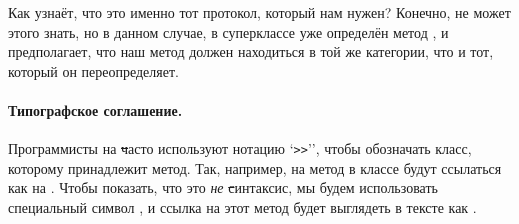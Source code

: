 \documentclass[a4paper,10pt,twoside]{book}
\begin{document}
Как \pharo узнаёт, что это именно тот протокол, который нам нужен? Конечно, \pharo не может этого знать, но в данном случае, в суперклассе уже определён метод , и \pharo предполагает, что наш метод  должен находиться в той же категории, что и тот, который он переопределяет.


\paragraph{Типографское соглашение.} Программисты на \st часто используют нотацию `\verb|>>|'', чтобы обозначать класс, которому принадлежит метод. Так, например, на метод  в классе  будут ссылаться как на .
Чтобы показать, что это \emph{не} \st синтаксис, мы будем использовать специальный символ \ct{>>>}, и ссылка на этот метод будет выглядеть в тексте как .
\end{document}
